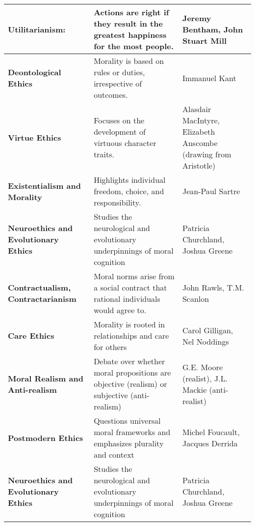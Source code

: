 \documentclass[12pt,a4]{article}
\begin{document}
\begin{table}[h!]
    \centering
    \begin{tabular}{p{3cm} p{5cm} p{4cm} } 
    \hline 
 
    \textbf{Utilitarianism:} 
        & Actions are right if they result in the greatest happiness for the most people. 
        & Jeremy Bentham, John Stuart Mill \\ \hline

    \textbf{Deontological Ethics} 
        & Morality is based on rules or duties, irrespective of outcomes.
        & Immanuel Kant \\ \hline
    
    \textbf{Virtue Ethics} 
        & Focuses on the development of virtuous character traits. 
        & Alasdair MacIntyre, Elizabeth Anscombe (drawing from Aristotle)\\ \hline 
    
    \textbf{Existentialism and Morality} 
        & Highlights individual freedom, choice, and responsibility.
        & Jean-Paul Sartre\\ \hline 
        
    \textbf{Neuroethics and Evolutionary Ethics}
        & Studies the neurological and evolutionary underpinnings of moral cognition 
        & Patricia Churchland, Joshua Greene\\ \hline 
         
    \textbf{Contractualism, Contractarianism} 
        & Moral norms arise from a social contract that rational individuals
          would agree to.
        & John Rawls, T.M. Scanlon \\ \hline

    \textbf{Care Ethics} 
        & Morality is rooted in relationships and care for others 
        & Carol Gilligan, Nel Noddings \\ \hline

    \textbf{Moral Realism and Anti-realism }
        & Debate over whether moral propositions are objective (realism) 
        or subjective (anti-realism) 
        & G.E. Moore (realist), J.L. Mackie (anti-realist) \\  \hline
        
    \textbf{Postmodern Ethics} 
        & Questions universal moral frameworks and emphasizes plurality and context 
        & Michel Foucault, Jacques Derrida \\ \hline
        
    \textbf{Neuroethics and Evolutionary Ethics} 
        & Studies the neurological and evolutionary underpinnings of moral cognition 
        & Patricia Churchland, Joshua Greene \\ 
    \hline

    \end{tabular}
    
\end{table}
\end{document}
